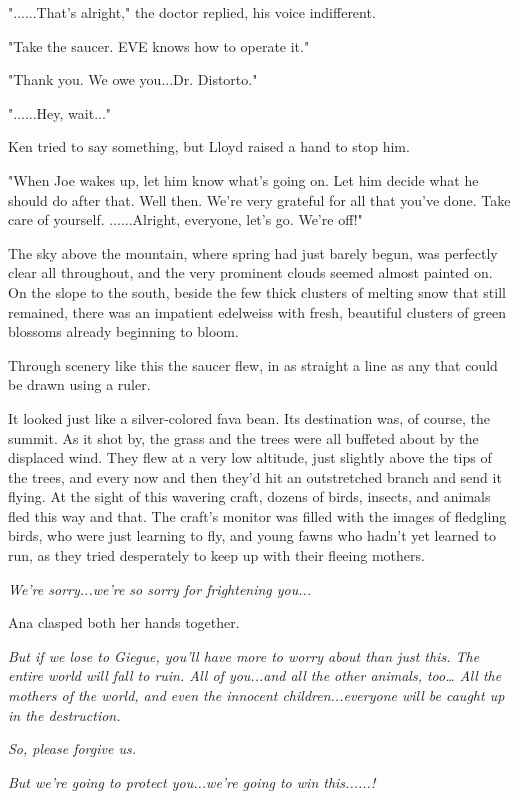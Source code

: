 \documentclass[
]{article}
\begin{document}
"......That's alright," the doctor replied, his voice indifferent.

"Take the saucer. EVE knows how to operate it."

"Thank you. We owe you...Dr. Distorto."

"......Hey, wait..."

Ken tried to say something, but Lloyd raised a hand to stop him.

"When Joe wakes up, let him know what's going on. Let him decide what he
should do after that. Well then. We're very grateful for all that you've
done. Take care of yourself. ......Alright, everyone, let's go. We're
off!"

The sky above the mountain, where spring had just barely begun, was
perfectly clear all throughout, and the very prominent clouds seemed
almost painted on. On the slope to the south, beside the few thick
clusters of melting snow that still remained, there was an impatient
edelweiss with fresh, beautiful clusters of green blossoms already
beginning to bloom.

Through scenery like this the saucer flew, in as straight a line as any
that could be drawn using a ruler.

It looked just like a silver-colored fava bean. Its destination was, of
course, the summit. As it shot by, the grass and the trees were all
buffeted about by the displaced wind. They flew at a very low altitude,
just slightly above the tips of the trees, and every now and then they'd
hit an outstretched branch and send it flying. At the sight of this
wavering craft, dozens of birds, insects, and animals fled this way and
that. The craft's monitor was filled with the images of fledgling birds,
who were just learning to fly, and young fawns who hadn't yet learned to
run, as they tried desperately to keep up with their fleeing mothers.

\emph{We're sorry...we're so sorry for frightening you...}

Ana clasped both her hands together.

\emph{But if we lose to Giegue, you'll have more to worry about than
just this. The entire world will fall to ruin. All of you...and all the
other animals, too\ldots{} All the mothers of the world, and even the
innocent children...everyone will be caught up in the destruction.}

\emph{So, please forgive us.}

\emph{But we're going to protect you...we're going to win this......!}
\end{document}
